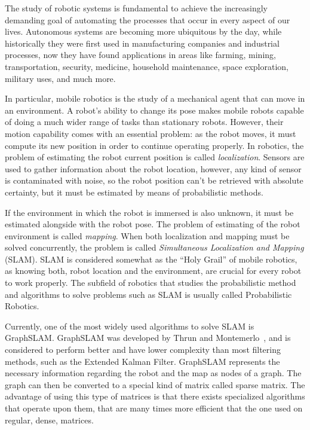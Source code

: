 The study of robotic systems is fundamental to achieve the increasingly demanding goal of automating the processes that occur in every aspect of our lives. Autonomous systems are becoming more ubiquitous by the day, while historically they were first used in manufacturing companies and industrial processes, now they have found applications in areas like farming, mining, transportation, security, medicine, household maintenance, space exploration, military uses, and much more.

In particular, mobile robotics is the study of a mechanical agent that can move in an environment. A robot's ability to change its pose makes mobile robots capable of doing a much wider range of tasks than stationary robots. However, their motion capability comes with an essential problem: as the robot moves, it must compute its new position in order to continue operating properly. In robotics, the problem of estimating the robot current position is called \textit{localization}. Sensors are used to gather information about the robot location, however, any kind of sensor is contaminated with noise, so the robot position can't be retrieved with absolute certainty, but it must be estimated by means of probabilistic methods.  


If the environment in which the robot is immersed is also unknown, it must be estimated alongside with the robot pose. The problem of estimating of the robot environment is called \textit{mapping}. When both localization and mapping must be solved concurrently, the problem is called \textit{Simultaneous Localization and Mapping} (SLAM). SLAM is considered somewhat as the ``Holy Grail'' of mobile robotics, as knowing both, robot location and the environment, are crucial for every robot to work properly. The subfield of robotics that studies the probabilistic method and algorithms to solve problems such as SLAM is usually called Probabilistic Robotics.

Currently, one of the most widely used algorithms to solve SLAM is GraphSLAM. GraphSLAM was developed by Thrun and Montemerlo~\cite{graphslam}, and is considered to perform better and have lower complexity than most filtering methods, such as the Extended Kalman Filter. GraphSLAM represents the necessary information regarding the robot and the map as nodes of a graph. The graph can then be converted to a special kind of matrix called sparse matrix. The advantage of using this type of matrices is that there exists specialized algorithms that operate upon them, that are many times more efficient that the one used on regular, dense, matrices. 


